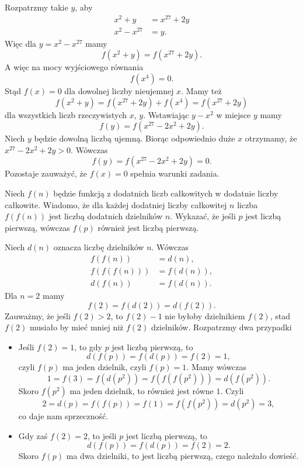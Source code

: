 
\noindent
Rozpatrzmy takie $y$, aby 
\begin{align*}
	x^2 + y &= x^{27} + 2y \\
	x^2 - x^{27} &= y.
\end{align*}
Więc dla $y = x^2 - x^{27}$ mamy
\[
	f(x^2 + y) = f(x^{27} + 2y).
\]
A więc na mocy wyjściowego równania
\[
	f(x^4) = 0.
\]
Stąd $f(x) = 0$ dla dowolnej liczby nieujemnej $x$. Mamy też
\[
	f(x^2 + y) = f(x^{27} + 2y) + f(x^4) =  f(x^{27} + 2y)
\]
dla wszystkich liczb rzeczywistych $x$, $y$. Wstawiając $y - x^2$ w miejsce $y$ mamy
\[
	f(y) = f(x^{27} - 2x^2 + 2y).
\]
Niech $y$ będzie dowolną liczbą ujemną. Biorąc odpowiednio duże $x$ otrzymamy, że $x^{27} - 2x^2 + 2y > 0$. Wówczas
\[
	f(y) = f(x^{27} - 2x^2 + 2y) = 0.
\]
Pozostaje zauważyć, że $f(x) = 0$ spełnia warunki zadania.

\begin{problem}{4}
	Niech $f(n)$ będzie funkcją z dodatnich liczb całkowitych w dodatnie liczby całkowite. Wiadomo, że dla każdej dodatniej liczby całkowitej $n$ liczba  $f(f(n))$ jest liczbą dodatnich dzielników $n$. Wykazać, że jeśli $p$ jest liczbą pierwszą, wówczas $f(p)$ również jest liczbą pierwszą.
\end{problem}

\noindent
Niech $d(n)$ oznacza liczbę dzielników $n$. Wówczas
\begin{align*}
	f(f(n)) &= d(n), \\
	f(f(f(n))) &= f(d(n)), \\
	d(f(n)) &= f(d(n)).
\end{align*}
Dla $n = 2$ mamy
\[
	f(2) = f(d(2)) = d(f(2)).
\]
Zauważmy, że jeśli $f(2) > 2$, to $f(2) - 1$ nie byłoby dzielnikiem $f(2)$, stad $f(2)$ musiało by mieć mniej niż $f(2)$ dzielników. Rozpatrzmy dwa przypadki
\begin{itemize}
	\item Jeśli $f(2) = 1$, to gdy $p$ jest liczbą pierwszą, to 
	\[
		d(f(p)) = f(d(p)) = f(2) = 1,
	\]
	czyli $f(p)$ ma jeden dzielnik, czyli $f(p) = 1$. Mamy wówczas
	\[
		1 = f(3) = f(d(p^2)) = f(f(f(p^2))) = d(f(p^2)).
	\]
	Skoro $f(p^2)$ ma jeden dzielnik, to również jest równe $1$. Czyli
	\[
		2 = d(p) = f(f(p)) = f(1) = f(f(p^2)) = d(p^2) = 3,
	\]
	co daje nam sprzeczność.
	\item Gdy zaś $f(2) = 2$, to jeśli $p$ jest liczbą pierwszą, to 
	\[
		d(f(p)) = f(d(p)) = f(2) = 2.
	\]
	Skoro $f(p)$ ma dwa dzielniki, to jest liczbą pierwszą, czego należało dowieść.
\end{itemize}

